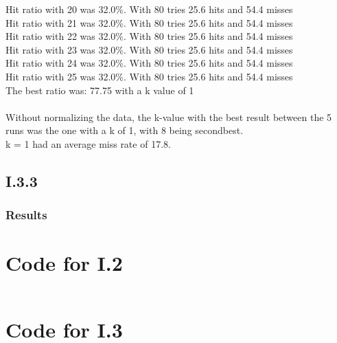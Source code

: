 \documentclass{article}
\begin{document}
Hit ratio with 20 was {\color{red}32.0\%}. With 80 tries 25.6 hits and 54.4 misses  \\
Hit ratio with 21 was {\color{red}32.0\%}. With 80 tries 25.6 hits and 54.4 misses  \\
Hit ratio with 22 was {\color{red}32.0\%}. With 80 tries 25.6 hits and 54.4 misses  \\
Hit ratio with 23 was {\color{red}32.0\%}. With 80 tries 25.6 hits and 54.4 misses  \\
Hit ratio with 24 was {\color{red}32.0\%}. With 80 tries 25.6 hits and 54.4 misses  \\
Hit ratio with 25 was {\color{red}32.0\%}. With 80 tries 25.6 hits and 54.4 misses  \\
The best ratio was: 77.75 with a k value of 1\\\\
Without normalizing the data, the k-value with the best result between the 5 runs was the one with a k of 1, with 8 being secondbest.\\
k = 1 had an average miss rate of 17.8.

\subsection{I.3.3}


\subsubsection*{Results}


\newpage
\begin{appendices}

\section{Code for I.2}

\inputminted{matlab}{matlab.m}

\section{Code for I.3}

\inputminted{python}{part2/neighborJohn.py}

\end{appendices}
\end{document}
